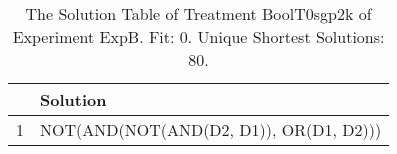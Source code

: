 \begin{table}[ht]
\centering
\begin{tabular}{rp{9cm}}
  \hline
 & Solution \\ 
  \hline
1 & NOT(AND(NOT(AND(D2, D1)), OR(D1, D2))) \\ 
   \hline
\end{tabular}
\caption{The Solution Table of Treatment BoolT0sgp2k of Experiment ExpB. Fit: 0. Unique Shortest Solutions: 80.} 
\end{table}
